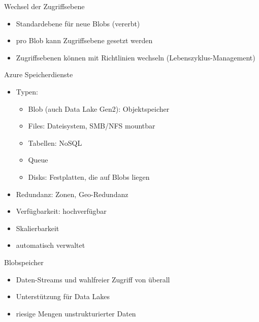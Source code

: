 \begin{flashcard}[Definition]{Wechsel der Zugriffsebene}
  \begin{itemize}
    \item Standardebene für neue Blobs (vererbt)
    \item pro Blob kann Zugriffsebene gesetzt werden
    \item Zugriffsebenen können mit Richtlinien wechseln (Lebenszyklus-Management)
  \end{itemize}
\end{flashcard}
 

\begin{flashcard}[Definition]{Azure Speicherdienste}
  \begin{itemize}
    \item Typen:
      \begin{itemize}
        \item Blob (auch Data Lake Gen2): Objektspeicher
        \item Files: Dateisystem, SMB/NFS mountbar
        \item Tabellen: NoSQL
        \item Queue
        \item Disks: Festplatten, die auf Blobs liegen
      \end{itemize}
    \item Redundanz: Zonen, Geo-Redundanz
    \item Verfügbarkeit: hochverfügbar
    \item Skalierbarkeit
    \item automatisch verwaltet
  \end{itemize}
\end{flashcard}

\begin{flashcard}[Definition]{Blobspeicher}
  \begin{itemize}
    \item Daten-Streams und wahlfreier Zugriff von überall
    \item Unterstützung für Data Lakes
    \item riesige Mengen unstrukturierter Daten
  \end{itemize}
\end{flashcard}

